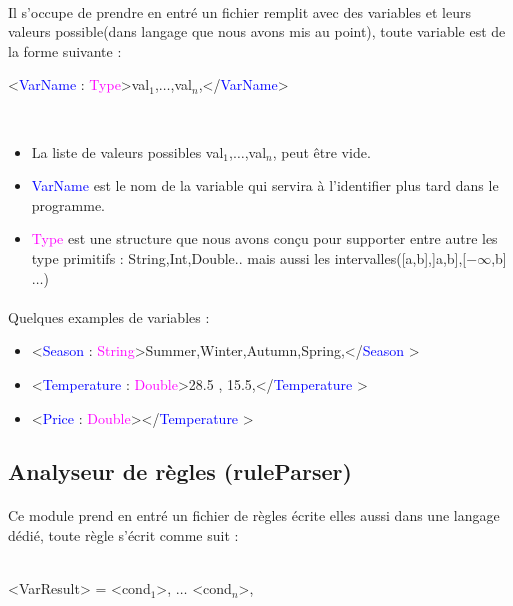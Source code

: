 \paragraph{}
Il s'occupe de prendre en entré un fichier remplit avec des variables et leurs valeurs possible(dans langage que nous avons mis au point), toute variable est de la forme suivante : \\
\newpage
\begin{minipage}{\textwidth}
	\centering
	\Large{<\textcolor{blue}{VarName} : \textcolor{Magenta}{Type}>val$_1$,$\dots$,val$_n$,</\textcolor{blue}{VarName}>}
\end{minipage}
\\
\begin{itemize}[label=\textbullet, font=\color{black}]
	\item La liste de valeurs possibles val$_1$,$\dots$,val$_n$, peut être vide.
	\item \textcolor{blue}{VarName} est le nom de la variable qui servira à l'identifier plus tard dans le programme.
	\item \textcolor{Magenta}{Type} est une structure que nous avons conçu pour supporter entre autre les type primitifs : String,Int,Double.. mais aussi les intervalles([a,b],]a,b],[$-\infty$,b]$\dots$) 	
\end{itemize}

\paragraph{}Quelques examples de variables : \\
\begin{itemize}[label=\textbullet, font=\color{black}]
	\item <\textcolor{blue}{Season} : \textcolor{Magenta}{String}>Summer,Winter,Autumn,Spring,</\textcolor{blue}{Season} >
	\item <\textcolor{blue}{Temperature} : \textcolor{Magenta}{Double}>28.5 , 15.5,</\textcolor{blue}{Temperature} >
	\item <\textcolor{blue}{Price} : \textcolor{Magenta}{Double}></\textcolor{blue}{Temperature} >
\end{itemize}

\subsection{Analyseur de règles (ruleParser)} 
\paragraph{}
Ce module prend en entré un fichier de règles écrite elles aussi dans une langage dédié, toute règle s'écrit comme suit : \\\\
\begin{minipage}{\textwidth}
	\centering
	\Large <VarResult> = <cond$_1$>, $\dots$ <cond$_n$>,\\
\end{minipage}

